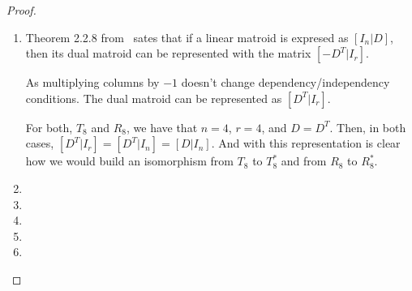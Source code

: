 \begin{proof}$\,$\pn
    \begin{enumerate}[label=(\roman*)]
        \item 
        
            Theorem 2.2.8 from~\cite{Oxley} sates that if a linear matroid is expresed as $[I_n | D]$,
            then its dual matroid can be represented with the matrix $[-D^T | I_r]$.\pn
            
            As multiplying columns by $-1$ doesn't change dependency/independency conditions. The dual matroid can be represented
            as $[D^T | I_r]$.\pn
            
            For both, $T_8$ and $R_8$, we have that $n = 4$, $r = 4$, and $D = D^T$. Then, in both cases, 
            $[D^T | I_r] = [D^T | I_n] = [D | I_n]$. And with this representation is clear how we would build an
            isomorphism from $T_8$ to $T_8^*$ and from $R_8$ to $R_8^*$.
        \item
        \item
        \item
        \item
        \item
    \end{enumerate}
\end{proof}